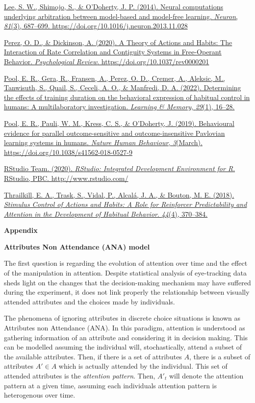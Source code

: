 \href{https://www.zotero.org/google-docs/?BlKSSL}{Lee, S. W., Shimojo, S., \& O'Doherty, J. P. (2014). Neural computations underlying arbitration between model-based and model-free learning. \emph{Neuron}, \emph{81}(3), 687--699. https://doi.org/10.1016/j.neuron.2013.11.028}

\href{https://www.zotero.org/google-docs/?BlKSSL}{Perez, O. D., \& Dickinson, A. (2020). A Theory of Actions and Habits: The Interaction of Rate Correlation and Contiguity Systems in Free-Operant Behavior. \emph{Psychological Review}. https://doi.org/10.1037/rev0000201}

\href{https://www.zotero.org/google-docs/?BlKSSL}{Pool, E. R., Gera, R., Fransen, A., Perez, O. D., Cremer, A., Aleksic, M., Tanwisuth, S., Quail, S., Ceceli, A. O., \& Manfredi, D. A. (2022). Determining the effects of training duration on the behavioral expression of habitual control in humans: A multilaboratory investigation. \emph{Learning \& Memory}, \emph{29}(1), 16--28.}

\href{https://www.zotero.org/google-docs/?BlKSSL}{Pool, E. R., Pauli, W. M., Kress, C. S., \& O'Doherty, J. (2019). Behavioural evidence for parallel outcome-sensitive and outcome-insensitive Pavlovian learning systems in humans. \emph{Nature Human Behaviour}, \emph{3}(March). https://doi.org/10.1038/s41562-018-0527-9}

\href{https://www.zotero.org/google-docs/?BlKSSL}{RStudio Team. (2020). \emph{RStudio: Integrated Development Environment for R}. RStudio, PBC. http://www.rstudio.com/}

\href{https://www.zotero.org/google-docs/?BlKSSL}{Thrailkill, E. A., Trask, S., Vidal, P., Alcalá, J. A., \& Bouton, M. E. (2018). \emph{Stimulus Control of Actions and Habits: A Role for Reinforcer Predictability and Attention in the Development of Habitual Behavior}. \emph{44}(4), 370--384.}

\textbf{Appendix}

\textbf{Attributes Non Attendance (ANA) model}

The first question is regarding the evolution of attention over time and the effect of the manipulation in attention. Despite statistical analysis of eye-tracking data sheds light on the changes that the decision-making mechanism may have suffered during the experiment, it does not link properly the relationship between visually attended attributes and the choices made by individuals.

The phenomena of ignoring attributes in discrete choice situations is known as Attributes non Attendance (ANA). In this paradigm, attention is understood as gathering information of an attribute and considering it in decision making. This can be modelled assuming the individual will, stochastically, attend a subset of the available attributes. Then, if there is a set of attributes \(A\), there is a subset of attributes \(A' \in A\) which is actually attended by the individual. This set of attended attributes is the \emph{attention pattern}. Then, \(A'_{t}\) will denote the attention pattern at a given time, assuming each individual\textquotesingle s attention pattern is heterogenous over time.

